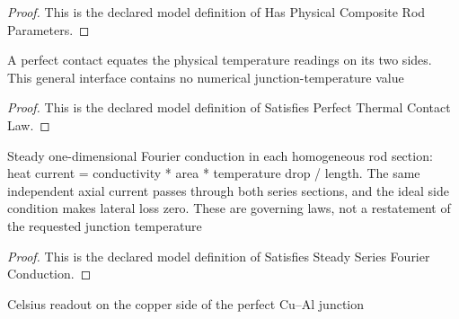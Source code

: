 \begin{proof}
  This is the declared model definition of Has Physical Composite Rod Parameters.
\end{proof}
\begin{definition}
  \label{def:physics:phyx-mini-0488:phyxminiproblems-problemphyxmini0488-satisfiesperfectthermalcontactlaw}
  A perfect contact equates the physical temperature readings on its two sides. This general interface contains no numerical junction-temperature value
\end{definition}
\begin{proof}
  This is the declared model definition of Satisfies Perfect Thermal Contact Law.
\end{proof}
\begin{definition}
  \label{def:physics:phyx-mini-0488:phyxminiproblems-problemphyxmini0488-satisfiessteadyseriesfourierconduction}
  Steady one-dimensional Fourier conduction in each homogeneous rod section: heat current = conductivity * area * temperature drop / length. The same independent axial current passes through both series sections, and the ideal side condition makes lateral loss zero. These are governing laws, not a restatement of the requested junction temperature
\end{definition}
\begin{proof}
  This is the declared model definition of Satisfies Steady Series Fourier Conduction.
\end{proof}
\begin{definition}
  \label{def:physics:phyx-mini-0488:phyxminiproblems-problemphyxmini0488-junctiontemperatureindegreescelsius}
  Celsius readout on the copper side of the perfect Cu--Al junction
\end{definition}
